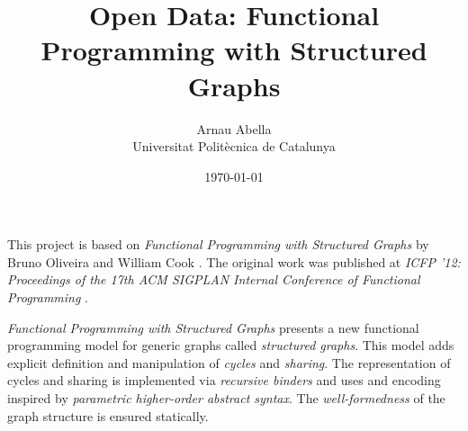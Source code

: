 \documentclass[12pt, a4paper]{article}
\title{%
  \vspace{-10ex}
  Open Data: Functional Programming with Structured Graphs
}
\author{%
  Arnau Abella \\
  \large{Universitat Polit\`ecnica de Catalunya}
}
\date{\today}
\begin{document}
\maketitle

This project is based on \textit{Functional Programming with Structured Graphs} by Bruno Oliveira and William Cook \cite{oliveira2012functional}. The original work was published at \textit{ICFP '12: Proceedings of the 17th ACM SIGPLAN Internal Conference of Functional Programming} \cite{icfp12}.

\textit{Functional Programming with Structured Graphs} presents a new functional programming model for generic graphs called \textit{structured graphs}. This model adds explicit definition and manipulation of \textit{cycles} and \textit{sharing}. The representation of cycles and sharing is implemented via \textit{recursive binders} and uses and encoding inspired by \textit{parametric higher-order abstract syntax}. The \textit{well-formedness} of the graph structure is ensured statically.











\end{document}
